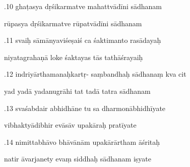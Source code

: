 \documentclass[article,12pt,a4paper]{memoir}%
\newcounter{parCount}
\begin{document}
	  
	  \pstart {}.10 ghaṭasya dṛśikarmatve mahattvādīni sādhanam 
	{}
	\pend%
      

	  
	  \pstart \leavevmode%
	rūpasya dṛśikarmatve rūpatvādīni sādhanam 
	{}
	\pend%
      

	  
	  \pstart {}.11 svaiḥ sāmānyaviśeṣaiś ca śaktimanto rasādayaḥ 
	{}
	\pend%
      

	  
	  \pstart \leavevmode%
	niyatagrahaṇā loke śaktayas tās tathāśrayaiḥ 
	{}
	\pend%
      

	  
	  \pstart {}.12 indriyārthamanaḥkartṛ- saṃbandhaḥ sādhanaṃ kva cit 
	{}
	\pend%
      

	  
	  \pstart \leavevmode%
	yad yadā yadanugrāhi tat tadā tatra sādhanam 
	{}
	\pend%
      

	  
	  \pstart {}.13 svaśabdair abhidhāne tu sa dharmonābhidhīyate 
	{}
	\pend%
      

	  
	  \pstart \leavevmode%
	vibhaktyādibhir evāsāv upakāraḥ pratīyate 
	{}
	\pend%
      

	  
	  \pstart {}.14 nimittabhāvo bhāvānām upakārārtham āśritaḥ 
	{}
	\pend%
      

	  
	  \pstart \leavevmode%
	natir āvarjanety evaṃ siddhaḥ sādhanam iṣyate 
	{}
	\pend%
      
\end{document}
